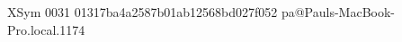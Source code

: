 XSym
0031
01317ba4a2587b01ab12568bd027f052
pa@Pauls-MacBook-Pro.local.1174
                                                                                                                                                                                                                                                                                                                                                                                                                                                                                                                                                                                                                                                                                                                                                                                                                                                                                                                                                                                                                                